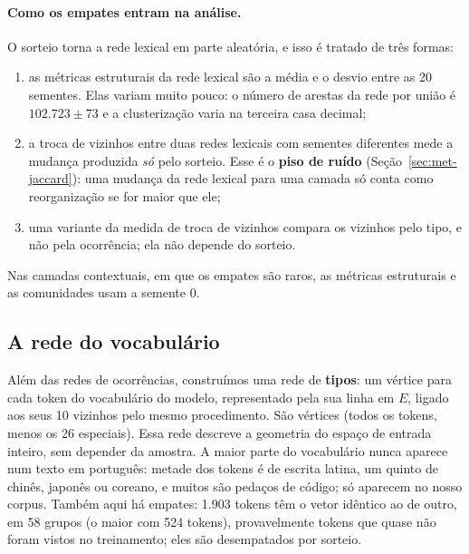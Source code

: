 \paragraph{Como os empates entram na análise.} O sorteio torna a rede lexical em parte
aleatória, e isso é tratado de três formas:
\begin{enumerate}
    \item as métricas estruturais da rede lexical são a média e o desvio entre as 20 sementes.
    Elas variam muito pouco: o número de arestas da rede por união é $102.723\pm73$ e a
    clusterização varia na terceira casa decimal;
    \item a troca de vizinhos entre duas redes lexicais com sementes diferentes mede a mudança
    produzida \emph{só} pelo sorteio. Esse é o \textbf{piso de ruído}
    (Seção~\ref{sec:met-jaccard}): uma mudança da rede lexical para uma camada só conta como
    reorganização se for maior que ele;
    \item uma variante da medida de troca de vizinhos compara os vizinhos pelo tipo, e não
    pela ocorrência; ela não depende do sorteio.
\end{enumerate}
Nas camadas contextuais, em que os empates são raros, as métricas estruturais e as
comunidades usam a semente 0.

\subsection{A rede do vocabulário}\label{sec:rede-vocab}

Além das redes de ocorrências, construímos uma rede de \textbf{tipos}: um vértice para cada
token do vocabulário do modelo, representado pela sua linha em $E$, ligado aos seus 10 vizinhos
pelo mesmo procedimento. São \nTiposVocab{} vértices (todos os tokens, menos os 26 especiais).
Essa rede descreve a geometria do espaço de entrada inteiro, sem depender da amostra. A maior
parte do vocabulário nunca aparece num texto em português: metade dos tokens é de escrita
latina, um quinto de chinês, japonês ou coreano, e muitos são pedaços de código; só
\nTiposVocabCorpus{} aparecem no nosso corpus. Também aqui há empates: 1.903 tokens têm o vetor
idêntico ao de outro, em 58 grupos (o maior com 524 tokens), provavelmente tokens que quase
não foram vistos no treinamento; eles são desempatados por sorteio.
